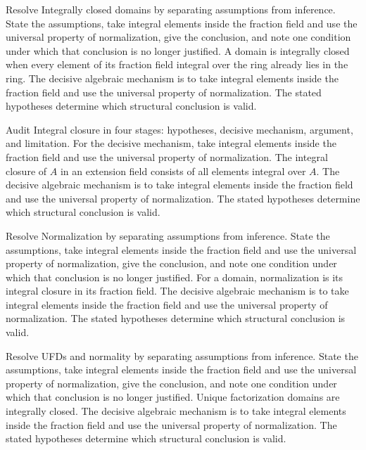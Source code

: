 \begin{example}\label{ex:v20-worked-01}
Resolve Integrally closed domains by separating assumptions from inference. State the assumptions, take integral elements inside the fraction field and use the universal property of normalization, give the conclusion, and note one condition under which that conclusion is no longer justified. A domain is integrally closed when every element of its fraction field integral over the ring already lies in the ring. The decisive algebraic mechanism is to take integral elements inside the fraction field and use the universal property of normalization. The stated hypotheses determine which structural conclusion is valid.
\end{example}

\begin{example}\label{ex:v20-worked-02}
Audit Integral closure in four stages: hypotheses, decisive mechanism, argument, and limitation. For the decisive mechanism, take integral elements inside the fraction field and use the universal property of normalization. The integral closure of $A$ in an extension field consists of all elements integral over $A$. The decisive algebraic mechanism is to take integral elements inside the fraction field and use the universal property of normalization. The stated hypotheses determine which structural conclusion is valid.
\end{example}

\begin{example}\label{ex:v20-worked-03}
Resolve Normalization by separating assumptions from inference. State the assumptions, take integral elements inside the fraction field and use the universal property of normalization, give the conclusion, and note one condition under which that conclusion is no longer justified. For a domain, normalization is its integral closure in its fraction field. The decisive algebraic mechanism is to take integral elements inside the fraction field and use the universal property of normalization. The stated hypotheses determine which structural conclusion is valid.
\end{example}

\begin{example}\label{ex:v20-worked-04}
Resolve UFDs and normality by separating assumptions from inference. State the assumptions, take integral elements inside the fraction field and use the universal property of normalization, give the conclusion, and note one condition under which that conclusion is no longer justified. Unique factorization domains are integrally closed. The decisive algebraic mechanism is to take integral elements inside the fraction field and use the universal property of normalization. The stated hypotheses determine which structural conclusion is valid.
\end{example}

